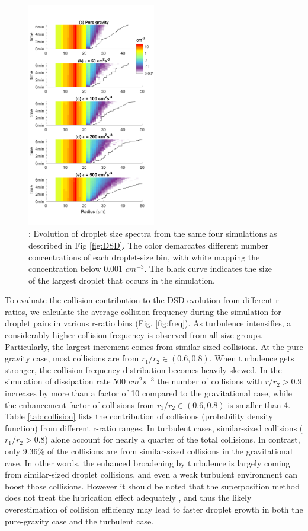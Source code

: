 \begin{figure}[ht]
\centering
\includegraphics[width=0.5\textwidth]{Figures/Chap3/timeDSD.png}
\caption{: Evolution of droplet size spectra from the same four simulations as described in Fig \ref{fig:DSD}. The color demarcates different number concentrations of each droplet-size bin, with white mapping the concentration below 0.001 $cm^{-3}$. The black curve indicates the size of the largest droplet that occurs in the simulation.} \label{fig:timeDSD}
\end{figure}


To evaluate the collision contribution to the DSD evolution from different r-ratios, we calculate the average collision frequency during the simulation for droplet pairs in various r-ratio bins (Fig. \ref{fig:freq}). As turbulence intensifies, a considerably higher collision frequency is observed from all size groups. Particularly, the largest increment comes from similar-sized collisions. At the pure gravity case, most collisions are from $r_1/r_2\in(0.6,0.8)$. When turbulence gets stronger, the collision frequency distribution becomes heavily skewed. In the simulation of dissipation rate 500 $cm^2s^{-3}$ the number of collisions with $r/r_2>0.9$ increases by more than a factor of 10 compared to the gravitational case, while the enhancement factor of collisions from $r_1/r_2\in(0.6,0.8)$ is smaller than 4. Table \ref{tab:collision} lists the contribution of collisions (probability density function) from different r-ratio ranges. In turbulent cases, similar-sized collisions ($r_1/r_2 > 0.8$) alone account for nearly a quarter of the total collisions. In contrast, only 9.36\% of the collisions are from similar-sized collisions in the gravitational case. In other words, the enhanced broadening by turbulence is largely coming from similar-sized droplet collisions, and even a weak turbulent environment can boost those collisions. However it should be noted that the superposition method does not treat the lubrication effect adequately \citep{Rosa2011,Wang2005a}, and thus the likely overestimation of collision efficiency may lead to faster droplet growth in both the pure-gravity case and the turbulent case.
 

